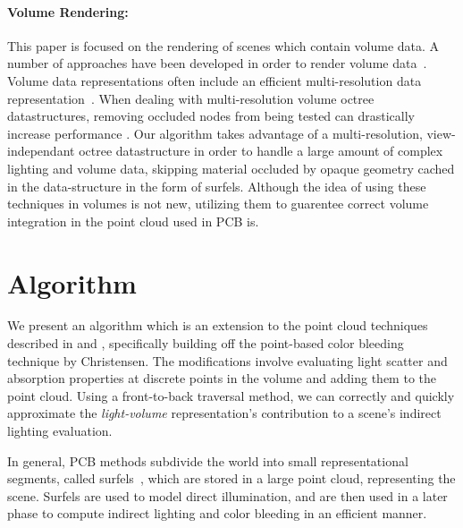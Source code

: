 \documentclass[runningheads]{llncs}
\begin{document}
\paragraph{Volume Rendering:}
This paper is focused on the rendering of scenes which contain volume data.  A number of approaches have been developed in order to render volume data~\cite{levoy88}\cite{Kajiya84}.  Volume data representations often include an efficient multi-resolution data representation~\cite{Westermann94}\cite{Levoy90}.  When dealing with multi-resolution volume octree datastructures, removing occluded nodes from being tested can drastically increase performance \cite{guthe}.  Our algorithm takes advantage of a multi-resolution, view-independant octree datastructure in order to handle a large amount of complex lighting and volume data, skipping material occluded by opaque geometry cached in the data-structure in the form of surfels.  Although the idea of using these techniques in volumes is not new, utilizing them to guarentee correct volume integration in the point cloud used in PCB is.

\section{Algorithm}
\label{algorithm_sec}
We present an algorithm which is an extension to the point cloud techniques described in \cite{tabellion} and \cite{christensen:2008}, specifically building off the point-based color bleeding technique by Christensen.  The modifications involve evaluating light scatter and absorption properties at discrete points in the volume and adding them to the point cloud.  Using a front-to-back traversal method, we can correctly and quickly approximate the \textit{light-volume} representation's contribution to a scene's indirect lighting evaluation.

In general, PCB methods subdivide the world into small representational segments, called surfels~\cite{christensen:2008}, which are stored in a large point cloud, representing the scene.  Surfels are used to model direct illumination, and are then used in a later phase to compute indirect lighting and color bleeding in an efficient manner.  
\end{document}
